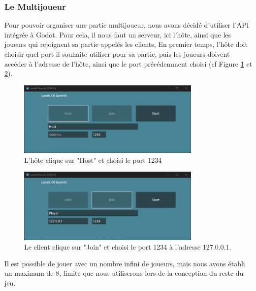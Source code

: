 
\subsubsection*{Le Multijoueur}

Pour pouvoir organiser une partie multijoueur, nous avons décidé d'utiliser l'API intégrée à Godot.
Pour cela, il nous faut un serveur, ici l'hôte, ainsi que les joueurs qui rejoignent sa partie appelés les clients,
En premier temps, l'hôte doit choisir quel port il souhaite utiliser pour sa partie, puis les joueurs doivent accéder à l'adresse de l'hôte, ainsi que le port précédemment choisi (cf Figure \ref{fig:gameplay1} et \ref*{fig:gameplay2}).

\begin{figure}[H]
    \centering
    \includegraphics[width=0.8\textwidth]{2.game/assets/gameplay1.png}
    \caption{L'hôte clique sur "Host" et choisi le port 1234}
    \label{fig:gameplay1}
\end{figure}

\begin{figure}[H]
    \centering
    \includegraphics[width=0.8\textwidth]{2.game/assets/gameplay2.png}
    \caption{Le client clique sur "Join" et choisi le port 1234 à l'adresse 127.0.0.1.}
    \label{fig:gameplay2}
\end{figure}

Il est possible de jouer avec un nombre infini de joueurs, mais nous avons établi un maximum de 8, limite que nous utiliserons lors de la conception du reste du jeu.
\\

